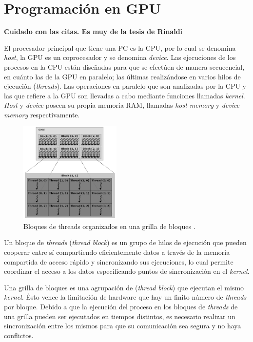 ﻿\chapter{Programación en GPU}
\graphicspath{{figs/cap3/}}
\label{cap3}

\textbf{Cuidado con las citas. Es muy de la tesis de Rinaldi}

El procesador principal que tiene una PC es la CPU, por lo cual se denomina \textit{host}, la GPU es un coprocesador y se denomina \textit{device}. Las ejecuciones de los procesos en la CPU están diseñadas para que se efectúen de manera secuecncial, en cuánto las de la GPU en paralelo; las últimas realizándose en varios hilos de ejecución (\textit{threads}). Las operaciones en paralelo que son analizadas por la CPU y las que refiere a la GPU son llevadas a cabo mediante funciones llamadas \textit{kernel}. \textit{Host} y \textit{device} poseen su propia memoria RAM, llamadas \textit{host memory} y \textit{device memory} respectivamente. \cite{rinaldi2011modelos}

\begin{figure}[h!]
	\centering
	\includegraphics[width=0.45\textwidth]{figs/cap3/threads_block_grid.png}
	\caption{Bloques de threads organizados en una grilla de bloques \cite{rinaldi2011modelos}.}
	\label{fig:block_grid_threads}
\end{figure}

Un bloque de \textit{threads} (\textit{thread block}) es un grupo de hilos de ejecución que pueden cooperar entre sí compartiendo eficientemente datos a través de la memoria compartida de acceso rápido y sincronizando sus ejecuciones, lo cual permite coordinar el acceso a los datos especificando puntos de sincronización en el \textit{kernel}. 

Una grilla de bloques es una agrupación de (\textit{thread block}) que ejecutan el mismo \textit{kernel}. Ésto vence la limitación de hardware que hay un finito número de \textit{threads} por bloque. Debido a que la ejecución del proceso en los bloques de \textit{threads} de una grilla pueden ser ejecutados en tiempos distintos, es necesario realizar un sincronización entre los mismos para que su comunicación sea segura y no haya conflictos.\cite{tolke2010implementation}

